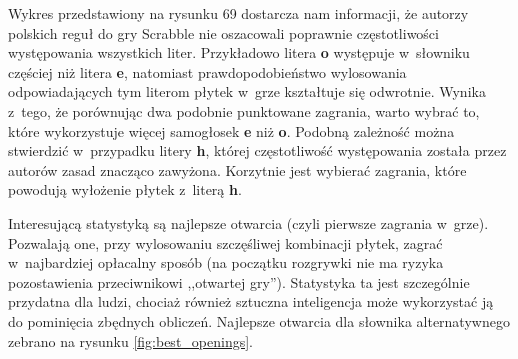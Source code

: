 \documentclass[a4paper,twocolumn,12pt]{article}
\theoremstyle{definition}
\begin{document}
Wykres przedstawiony na rysunku 69 dostarcza nam informacji, że autorzy polskich reguł do gry Scrabble nie oszacowali poprawnie częstotliwości występowania wszystkich liter. Przykładowo litera \textbf{o} występuje w~słowniku częściej niż litera \textbf{e}, natomiast prawdopodobieństwo wylosowania odpowiadających tym literom płytek w~grze kształtuje się odwrotnie. Wynika z~tego, że porównując dwa podobnie punktowane zagrania, warto wybrać to, które wykorzystuje więcej samogłosek \textbf{e} niż \textbf{o}. Podobną zależność można stwierdzić w~przypadku litery \textbf{h}, której częstotliwość występowania została przez autorów zasad znacząco zawyżona. Korzytnie jest wybierać zagrania, które powodują wyłożenie płytek z~literą \textbf{h}.

Interesującą statystyką są najlepsze otwarcia (czyli pierwsze zagrania w~grze). Pozwalają one, przy wylosowaniu szczęśliwej kombinacji płytek, zagrać w~najbardziej opłacalny sposób (na początku rozgrywki nie ma ryzyka pozostawienia przeciwnikowi ,,otwartej gry''). Statystyka ta jest szczególnie przydatna dla ludzi, chociaż również sztuczna inteligencja może wykorzystać ją do pominięcia zbędnych obliczeń. Najlepsze otwarcia dla słownika alternatywnego zebrano na rysunku \ref{fig:best_openings}.
\end{document}
